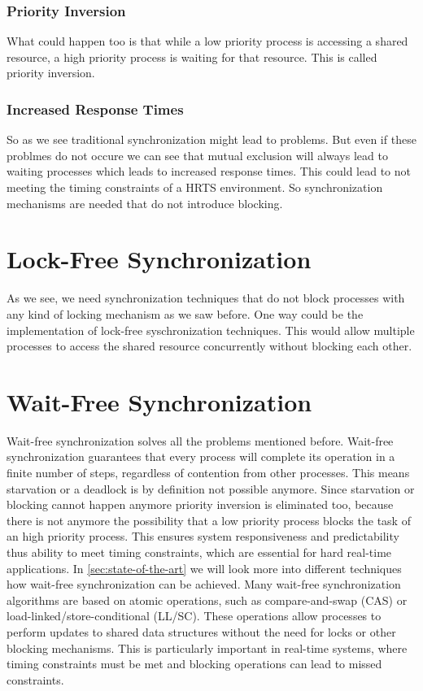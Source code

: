 \subsubsection{Priority Inversion}\label{subsubsec:priority-inversion}

What could happen too is that while a low priority process is accessing a shared resource, a high priority process is waiting for that resource. This is called priority inversion. \cite{priorityInversion}

\subsubsection{Increased Response Times}\label{subsubsec:increased-response-times}

So as we see traditional synchronization might lead to problems. But even if these problmes do not occure we can see that mutual exclusion will always lead to waiting processes which leads to increased response times. This could lead to not meeting the timing constraints of a \ac{HRTS} environment. So synchronization mechanisms are needed that do not introduce blocking.

\section{Lock-Free Synchronization}\label{sec:lock-free}

As we see, we need synchronization techniques that do not block processes with any kind of locking mechanism as we saw before. One way could be the implementation of lock-free syschronization techniques. This would allow multiple processes to access the shared resource concurrently without blocking each other.  

\section{Wait-Free Synchronization}\label{sec:wait-free}

Wait-free synchronization solves all the problems mentioned before. Wait-free synchronization guarantees that every process will complete its operation in a finite number of steps, regardless of contention from other processes. This means starvation or a deadlock is by definition not possible anymore. Since starvation or blocking cannot happen anymore priority inversion is eliminated too, because there is not anymore the possibility that a low priority process blocks the task of an high priority process. This ensures system responsiveness and predictability thus ability to meet timing constraints, which are essential for hard real-time applications. In \cref{sec:state-of-the-art} we will look more into different techniques how wait-free synchronization can be achieved. Many wait-free synchronization algorithms are based on atomic operations, such as compare-and-swap (CAS) or load-linked/store-conditional (LL/SC). These operations allow processes to perform updates to shared data structures without the need for locks or other blocking mechanisms. This is particularly important in real-time systems, where timing constraints must be met and blocking operations can lead to missed constraints. \cite{waitFreeSynchronization}

